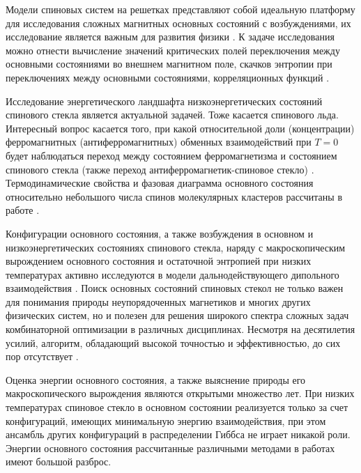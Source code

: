 \documentclass[utf8, babel, sor, jor, amsmath, amssymb, reprint]{elsarticle} %
\begin{document}
Модели спиновых систем на решетках представляют собой идеальную платформу для исследования сложных магнитных основных состояний с возбуждениями, их исследование является важным для развития физики \cite{lacroix2011introduction}. К задаче исследования можно отнести вычисление значений критических полей переключения между основными состояниями во внешнем магнитном поле, скачков энтропии при переключениях между основными состояниями, корреляционных функций \cite{ramirez2004effect, rosas2004random, andriushchenko2019large}. 

Исследование энергетического ландшафта низкоэнергетических состояний спинового стекла \cite{biswas2023energy} является актуальной задачей. Тоже касается спинового льда. Интересный вопрос касается того, при какой относительной доли (концентрации) ферромагнитных (антиферромагнитных) обменных взаимодействий при $T=0$ будет наблюдаться переход между состоянием ферро\-маг\-не\-тиз\-ма и состоянием спинового стекла (также переход анти\-ферро\-маг\-не\-тик-спиновое стекло) \cite{gruzberg2001random, honecker2001universality, picco2006strong, tsomokos2011interplay, zimmer2022role}. Термодинамические свойства и фазовая диаграмма основного состояния относительно небольшого числа спинов молекулярных кластеров рассчитаны в работе \cite{dias2023ground}.

Конфигурации основного состояния, а также возбуждения в основном и низкоэнергетических состояниях спинового стекла, наряду с макроскопическим вырождением основного состояния и остаточной энтропией  при низких температурах активно исследуются в модели дальнодействующего дипольного взаимодействия \cite{makarova2021low, singh2024micromagnetic}. Поиск основных состояний спиновых стекол не только важен для понимания природы неупорядоченных магнетиков и многих других физических систем, но и полезен для решения широкого спектра сложных задач комбинаторной оптимизации в различных дисциплинах. Несмотря на десятилетия усилий, алгоритм, обладающий высокой точностью и эффективностью, до сих пор отсутствует \cite{fan2023searching}.

Оценка энергии основного состояния, а также выяснение природы его макроскопического вырождения являются открытыми множество лет. При низких температурах спиновое стекло в основном состоянии реализуется только за счет конфигураций, имеющих минимальную энергию взаимодействия, при этом ансамбль других конфигураций в распределении Гиббса не играет никакой роли. Энергии основного состояния рассчитанные различными методами в работах \cite{thouless1977solution, sherrington1975solvable, tanaka1980analytic, klein1976comparison, kirkpatrick1978infinite,  karandashev2019global, palmer1999ground, campbell2004energy, roma2009ground} имеют большой разброс.
\end{document}
